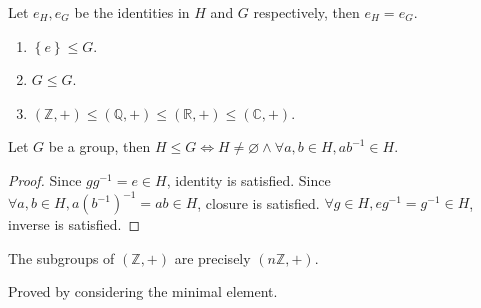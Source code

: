\documentclass[10pt]{article}
\def\le{\leqslant}
\begin{document}
    \begin{proposition}\label{prop:uniqueness of identity}
        Let $ e_H, e_G $ be the identities in $H$ and $G$ respectively, then $e_H=e_G$. 
    \end{proposition}
    \begin{example}
        \begin{enumerate}[(1)]
            \item $ \left\{ e\right\} \le G $.
            \item $ G\le G $.
            \item $ (\mathbb{Z} ,+)\le (\mathbb{Q} ,+)\le (\mathbb{R} ,+)\le (\mathbb{C} ,+) $.
        \end{enumerate}
    \end{example}
    \begin{lemma}\label{lma:subgroup test}
        Let $ G $ be a group, then $ H\le G \Leftrightarrow H\neq \varnothing \land \forall a,b\in H, ab^{-1}\in H $.
    \end{lemma}
    \begin{proof}
        Since $gg^{-1}=e\in H$, identity is satisfied. Since $ \forall a,b\in H, a(b^{-1})^{-1}=ab\in H $, closure is satisfied. $ \forall g\in H, eg^{-1}=g^{-1}\in H $, inverse is satisfied.
    \end{proof}
    \begin{proposition}\label{prop:subgroups of integers}
        The subgroups of $ (\mathbb{Z} ,+) $ are precisely $ (n \mathbb{Z} ,+) $.
    \end{proposition}
    Proved by considering the minimal element.
\end{document}
